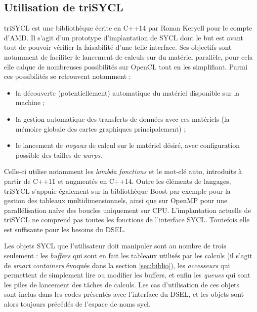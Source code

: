 \subsection{Utilisation de \textsf{triSYCL}}

\textsf{triSYCL} est une bibliothèque écrite en \textsf{C++14} par Ronan Keryell pour le compte d'\textsf{AMD}. Il s'agit d'un prototype d'implantation de \textsf{SYCL} dont le but est avant tout de pouvoir vérifier la faisabilité d'une telle interface. Ses objectifs sont notamment de faciliter le lancement de calculs sur du matériel parallèle, pour cela elle calque de nombreuses possibilités sur \textsf{OpenCL} tout en les simplifiant. Parmi ces possibilités se retrouvent notamment :
\begin{itemize} 
\item la découverte (potentiellement) automatique du matériel disponible sur la machine ;
\item la gestion automatique des transferts de données avec ces matériels (la mémoire globale des cartes graphiques principalement) ;
\item le lancement de \emph{noyaux} de calcul sur le matériel désiré, avec configuration possible des tailles de \emph{warps}.
\end{itemize}

Celle-ci utilise notamment les \emph{lambda fonctions} et le mot-clé \textsf{auto}, introduits à partir de \textsf{C++11} et augmentés en \textsf{C++14}. Outre les éléments de langages, \textsf{triSYCL} s'appuie également sur la bibliothèque \textsf{Boost} par exemple pour la gestion des tableaux multidimensionnels, ainsi que sur \textsf{OpenMP} pour une parallélisation naïve des boucles uniquement sur CPU. L'implantation actuelle de \textsf{triSYCL} ne comprend pas toutes les fonctions de l'interface \textsf{SYCL}. Toutefois elle est suffisante pour les besoins du DSEL.

Les objets \textsf{SYCL} que l'utilisateur doit manipuler sont au nombre de trois seulement : les \emph{buffers} qui sont en fait les tableaux utilisés par les calculs (il s'agit de \emph{smart containers} évoqués dans la section \ref{sec:biblio}), les \emph{accesseurs} qui permettent de simplement lire ou modifier les buffers, et enfin les \emph{queues} qui sont les piles de lancement des tâches de calculs. Les cas d'utilisation de ces objets sont inclus dans les codes présentés avec l'interface du DSEL, et les objets sont alors toujours précédés de l'espace de noms \textsf{sycl}.

